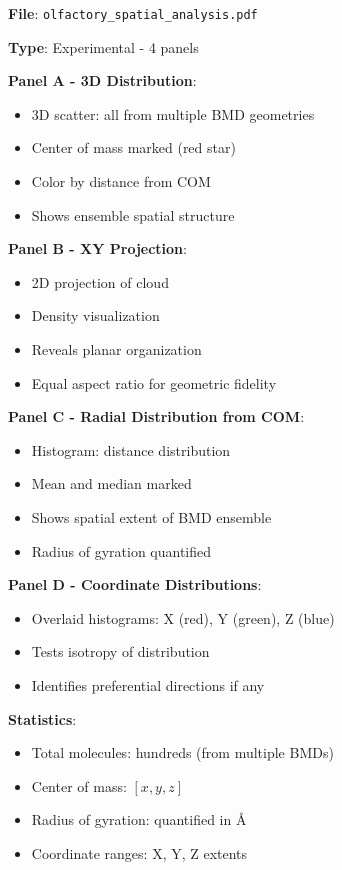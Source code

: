\documentclass[11pt]{article}
\begin{document}
\textbf{File}: \texttt{olfactory\_spatial\_analysis.pdf}

\textbf{Type}: Experimental - 4 panels

\textbf{Panel A - 3D  Distribution}:
\begin{itemize}
\item 3D scatter: all  from multiple BMD geometries
\item Center of mass marked (red star)
\item Color by distance from COM
\item Shows ensemble spatial structure
\end{itemize}

\textbf{Panel B - XY Projection}:
\begin{itemize}
\item 2D projection of  cloud
\item Density visualization
\item Reveals planar organization
\item Equal aspect ratio for geometric fidelity
\end{itemize}

\textbf{Panel C - Radial Distribution from COM}:
\begin{itemize}
\item Histogram: distance distribution
\item Mean and median marked
\item Shows spatial extent of BMD ensemble
\item Radius of gyration quantified
\end{itemize}

\textbf{Panel D - Coordinate Distributions}:
\begin{itemize}
\item Overlaid histograms: X (red), Y (green), Z (blue)
\item Tests isotropy of distribution
\item Identifies preferential directions if any
\end{itemize}

\textbf{Statistics}:
\begin{itemize}
\item Total  molecules: hundreds (from multiple BMDs)
\item Center of mass: $[x, y, z]$
\item Radius of gyration: quantified in Å
\item Coordinate ranges: X, Y, Z extents
\end{itemize}
\end{document}
